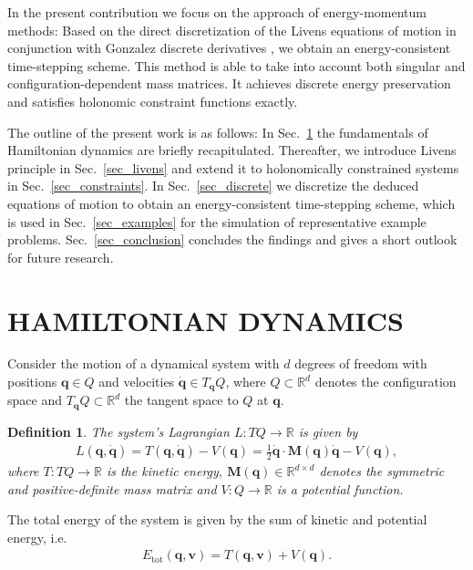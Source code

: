 \documentclass{multibody2023_full_paper}
\newtheorem{definition}[theorem]{Definition}
\renewcommand{\vec}[1]{\ensuremath{\mbox{$\mathbf{#1}$}}}
\begin{document}
In the present contribution we focus on the approach of energy-momentum methods: Based on the direct discretization of the Livens equations of motion in conjunction with Gonzalez discrete derivatives \cite{gonzalez_time_1996}, we obtain an energy-consistent time-stepping scheme. This method is able to take into account both singular and configuration-dependent mass matrices. It achieves discrete energy preservation and satisfies holonomic constraint functions exactly.

The outline of the present work is as follows: In Sec.~\ref{sec_ham} the fundamentals of Hamiltonian dynamics are briefly recapitulated. Thereafter, we introduce Livens principle in Sec.~\ref{sec_livens} and extend it to holonomically constrained systems in Sec.~\ref{sec_constraints}. In Sec.~\ref{sec_discrete} we discretize the deduced equations of motion to obtain an energy-consistent time-stepping scheme, which is used in Sec.~\ref{sec_examples} for the simulation of representative example problems. Sec.~\ref{sec_conclusion} concludes the findings and gives a short outlook for future research.

\section{HAMILTONIAN DYNAMICS}\label{sec_ham}
Consider the motion of a dynamical system with $d$ degrees of freedom with positions $\vec{q} \in Q$ and velocities $\dot{\vec{q}} \in T_\mathbf{q} Q$, where $ Q \subset \mathbb{R}^d$ denotes the configuration space and $T_\mathbf{q} Q \subset \mathbb{R}^d$ the tangent space to $Q$ at $\vec{q}$.
\begin{definition}
    The system's Lagrangian $L \colon TQ \to \mathbb{R}$ is given by
    \begin{align}
        L(\vec{q},\dot{\vec{q}}) = T(\vec{q},\dot{\vec{q}}) - V(\vec{q}) = \frac{1}{2} \dot{\vec{q}} \cdot \vec{M}(\vec{q}) \dot{\vec{q}} -V(\vec{q}), \label{lagrangefunction}
    \end{align}
    where $T:TQ \rightarrow \mathbb{R}$ is the kinetic energy, $\vec{M}(\vec{q}) \in \mathbb{R}^{d \times d}$ denotes the symmetric and positive-definite mass matrix and $V: Q \rightarrow \mathbb{R}$ is a potential function.
\end{definition}

The total energy of the system is given by the sum of kinetic and potential energy, i.e.
\begin{align} \label{total_energy}
    E_\mathrm{tot}(\vec{q},\vec{v}) = T(\vec{q},\vec{v}) + V(\vec{q}) .
\end{align}
\end{document}
